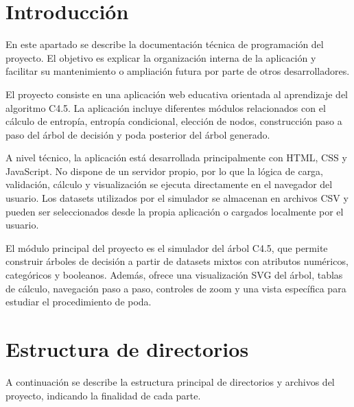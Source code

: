 
\section{Introducción}

En este apartado se describe la documentación técnica de programación del proyecto. El objetivo es explicar la organización interna de la aplicación y facilitar su mantenimiento o ampliación futura por parte de otros desarrolladores.

El proyecto consiste en una aplicación web educativa orientada al aprendizaje del algoritmo C4.5. La aplicación incluye diferentes módulos relacionados con el cálculo de entropía, entropía condicional, elección de nodos, construcción paso a paso del árbol de decisión y poda posterior del árbol generado.

A nivel técnico, la aplicación está desarrollada principalmente con HTML, CSS y JavaScript. No dispone de un servidor propio, por lo que la lógica de carga, validación, cálculo y visualización se ejecuta directamente en el navegador del usuario. Los datasets utilizados por el simulador se almacenan en archivos CSV y pueden ser seleccionados desde la propia aplicación o cargados localmente por el usuario.

El módulo principal del proyecto es el simulador del árbol C4.5, que permite construir árboles de decisión a partir de datasets mixtos con atributos numéricos, categóricos y booleanos. Además, ofrece una visualización SVG del árbol, tablas de cálculo, navegación paso a paso, controles de zoom y una vista específica para estudiar el procedimiento de poda.

\section{Estructura de directorios}

A continuación se describe la estructura principal de directorios y archivos del proyecto, indicando la finalidad de cada parte.

